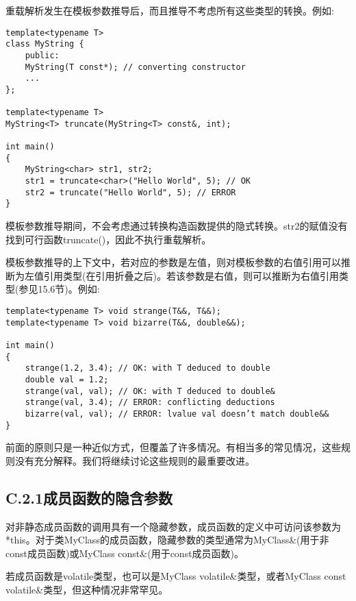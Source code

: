 重载解析发生在模板参数推导后，而且推导不考虑所有这些类型的转换。例如:

\begin{lstlisting}[style=styleCXX]
template<typename T>
class MyString {
	public:
	MyString(T const*); // converting constructor
	...
};

template<typename T>
MyString<T> truncate(MyString<T> const&, int);

int main()
{
	MyString<char> str1, str2;
	str1 = truncate<char>("Hello World", 5); // OK
	str2 = truncate("Hello World", 5); // ERROR
}
\end{lstlisting}

模板参数推导期间，不会考虑通过转换构造函数提供的隐式转换。str2的赋值没有找到可行函数truncate()，因此不执行重载解析。

模板参数推导的上下文中，若对应的参数是左值，则对模板参数的右值引用可以推断为左值引用类型(在引用折叠之后)。若该参数是右值，则可以推断为右值引用类型(参见15.6节)。例如:

\begin{lstlisting}[style=styleCXX]
template<typename T> void strange(T&&, T&&);
template<typename T> void bizarre(T&&, double&&);

int main()
{
	strange(1.2, 3.4); // OK: with T deduced to double
	double val = 1.2;
	strange(val, val); // OK: with T deduced to double&
	strange(val, 3.4); // ERROR: conflicting deductions
	bizarre(val, val); // ERROR: lvalue val doesn’t match double&&
}
\end{lstlisting}

前面的原则只是一种近似方式，但覆盖了许多情况。有相当多的常见情况，这些规则没有充分解释。我们将继续讨论这些规则的最重要改进。

\subsection{C.2.1\hspace{0.2cm}成员函数的隐含参数}

对非静态成员函数的调用具有一个隐藏参数，成员函数的定义中可访问该参数为*this。对于类MyClass的成员函数，隐藏参数的类型通常为MyClass\&(用于非const成员函数)或MyClass const\&(用于const成员函数)。

\begin{tcolorbox}[colback=webgreen!5!white,colframe=webgreen!75!black]
\hspace*{0.75cm}若成员函数是volatile类型，也可以是MyClass volatile\&类型，或者MyClass const volatile\&类型，但这种情况非常罕见。
\end{tcolorbox}

